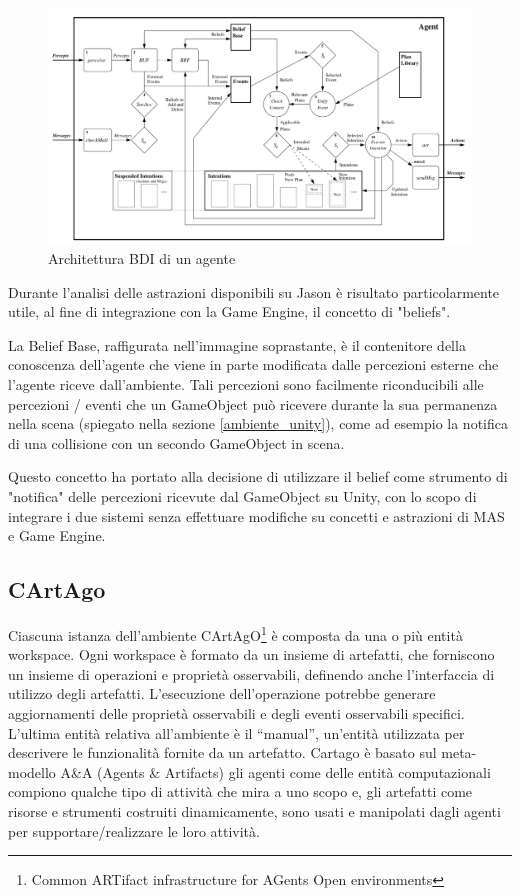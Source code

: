 \begin{figure}[H]
\centering
\includegraphics[width=\textwidth]{figures/Agent_BDI_Lifecycle.png}
\caption{Architettura BDI di un agente\cite{jason-book}}
\end{figure}

Durante l'analisi delle astrazioni disponibili su Jason è risultato particolarmente utile, al fine di integrazione con la Game Engine, il concetto di "beliefs". 

\medskip

La Belief Base, raffigurata nell'immagine soprastante, è il contenitore della conoscenza dell'agente che viene in parte modificata dalle percezioni esterne che l'agente riceve dall'ambiente. Tali percezioni sono facilmente riconducibili alle percezioni / eventi che un GameObject può ricevere durante la sua permanenza nella scena (spiegato nella sezione \ref{ambiente_unity}), come ad esempio la notifica di una collisione con un secondo GameObject in scena. 

\medskip

Questo concetto ha portato alla decisione di utilizzare il belief come strumento di "notifica" delle percezioni ricevute dal GameObject su Unity, con lo scopo di integrare i due sistemi senza effettuare modifiche su concetti e astrazioni di MAS e Game Engine.

\subsection{CArtAgo}
Ciascuna istanza dell'ambiente CArtAgO\footnote{Common ARTifact infrastructure for AGents Open environments} è composta da una o più entità workspace. Ogni workspace è formato da un insieme di artefatti, che forniscono un insieme di operazioni e proprietà osservabili, definendo anche l'interfaccia di utilizzo degli artefatti. L'esecuzione dell'operazione potrebbe generare aggiornamenti delle proprietà osservabili e degli eventi osservabili specifici. L'ultima entità relativa all'ambiente è il “manual”, un'entità utilizzata per descrivere le funzionalità fornite da un artefatto.
Cartago è basato sul meta-modello A\&A (Agents \& Artifacts) gli agenti come delle entità computazionali compiono qualche tipo di attività che mira a uno scopo e, gli artefatti come risorse e strumenti costruiti dinamicamente, sono usati e manipolati dagli agenti per supportare/realizzare le loro attività.\cite{cartago}

